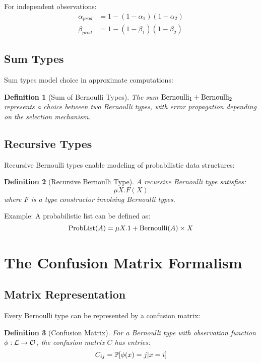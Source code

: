 \documentclass[11pt]{article}
\newtheorem{definition}{Definition}
\begin{document}
For independent observations:
\begin{align}
\alpha_{prod} &= 1 - (1-\alpha_1)(1-\alpha_2) \\
\beta_{prod} &= 1 - (1-\beta_1)(1-\beta_2)
\end{align}

\subsection{Sum Types}

Sum types model choice in approximate computations:

\begin{definition}[Sum of Bernoulli Types]
The sum $\text{Bernoulli}_1 + \text{Bernoulli}_2$ represents a choice between two Bernoulli types, with error propagation depending on the selection mechanism.
\end{definition}

\subsection{Recursive Types}

Recursive Bernoulli types enable modeling of probabilistic data structures:

\begin{definition}[Recursive Bernoulli Type]
A recursive Bernoulli type satisfies:
$$\mu X. F(X)$$
where $F$ is a type constructor involving Bernoulli types.
\end{definition}

Example: A probabilistic list can be defined as:
$$\text{ProbList}(A) = \mu X. 1 + \text{Bernoulli}(A) \times X$$

\section{The Confusion Matrix Formalism}

\subsection{Matrix Representation}

Every Bernoulli type can be represented by a confusion matrix:

\begin{definition}[Confusion Matrix]
For a Bernoulli type with observation function $\phi: \mathcal{L} \to \mathcal{O}$, the confusion matrix $C$ has entries:
$$C_{ij} = \mathbb{P}[\phi(x) = j | x = i]$$
\end{definition}
\end{document}
